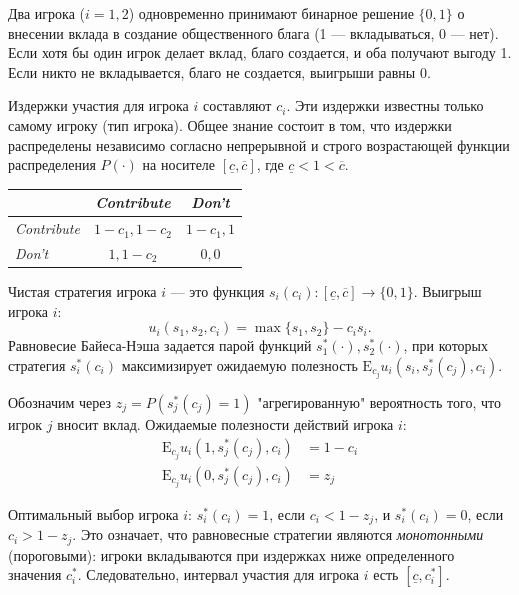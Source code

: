 \begin{example}
Два игрока ($i = 1, 2$) одновременно принимают бинарное решение $\{0, 1\}$ о внесении вклада в создание общественного блага (1 — вкладываться, 0 — нет). Если хотя бы один игрок делает вклад, благо создается, и оба получают выгоду 1. Если никто не вкладывается, благо не создается, выигрыши равны 0. 

Издержки участия для игрока $i$ составляют $c_i$. Эти издержки известны только самому игроку (тип игрока). Общее знание состоит в том, что издержки распределены независимо согласно непрерывной и строго возрастающей функции распределения $P(\cdot)$ на носителе $[\underline{c}, \overline{c}]$, где $\underline{c} < 1 < \overline{c}$. 

\begin{table}
\centering
\begin{NiceTabular}{l|cc}
\toprule
& \textit{Contribute} & \textit{Don't} \\
\midrule
\textit{Contribute} & $1 - c_1, 1 - c_2$ & $1 - c_1, 1$ \\
\textit{Don't}      & $1, 1 - c_2$       & $0, 0$ \\
\bottomrule
\end{NiceTabular}
\end{table}

Чистая стратегия игрока $i$ — это функция $s_i(c_i) : [\underline{c}, \overline{c}] \to \{0, 1\}$. Выигрыш игрока $i$:
\[
u_i(s_1, s_2, c_i) = \max\{s_1, s_2\} - c_i s_i.
\]
Равновесие Байеса-Нэша задается парой функций $s_1^*(\cdot), s_2^*(\cdot)$, при которых стратегия $s_i^*(c_i)$ максимизирует ожидаемую полезность $\mathrm{E}_{c_j} u_i(s_i, s_j^*(c_j), c_i)$.

Обозначим через $z_j = P(s_j^*(c_j) = 1)$ "агрегированную" вероятность того, что игрок $j$ вносит вклад. Ожидаемые полезности действий игрока $i$:
\begin{align*}
    \mathrm{E}_{c_j} u_i(1, s_j^*(c_j), c_i) &= 1 - c_i \\
    \mathrm{E}_{c_j} u_i(0, s_j^*(c_j), c_i) &= z_j
\end{align*}

Оптимальный выбор игрока $i$: $s_i^*(c_i) = 1$, если $c_i < 1 - z_j$, и $s_i^*(c_i) = 0$, если $c_i > 1 - z_j$. Это означает, что равновесные стратегии являются \textit{монотонными} (пороговыми): игроки вкладываются при издержках ниже определенного значения $c_i^*$. Следовательно, интервал участия для игрока $i$ есть $[\underline{c}, c_i^*]$.


\end{example}
